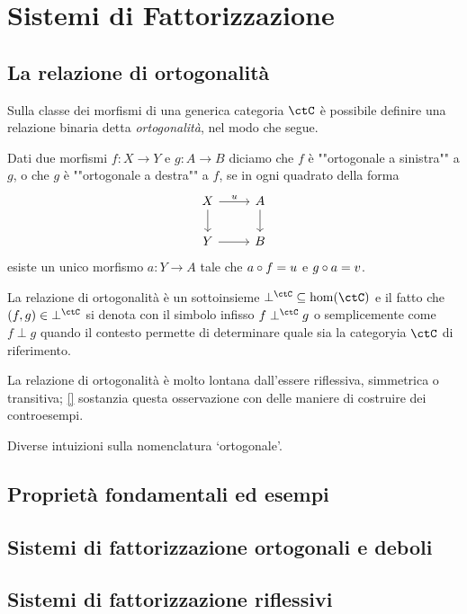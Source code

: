 \chapter{Sistemi di Fattorizzazione}
\section[Ortogonalità]{La relazione di ortogonalità}
Sulla classe dei morfismi di una generica categoria $\ctC$ è possibile definire una relazione binaria detta \emph{ortogonalità}, nel modo che segue.
\begin{definition}
    Dati due morfismi $f : X\to Y$ e $g : A\to B$ diciamo che $f$ è ""ortogonale a sinistra"" a $g$, o che $g$ è ""ortogonale a destra"" a $f$, se in ogni quadrato della forma 
    \[
   \begin{tikzcd}[baseline=(current bounding box.center)]
           X \ar[r, "u"]\ar[d]& A\ar[d] \\ 
           Y \ar[r]& B
   \end{tikzcd} 
    \]
esiste un unico morfismo $a : Y\to A$ tale che $a\circ f=u$ e $g\circ a=v$.
\end{definition}
La relazione di ortogonalità è un sottoinsieme $\mathbin{\perp^\ctC} \subseteq \hom(\ctC)$ e il fatto che $(f,g)\in \mathbin{\perp^\ctC}$ si denota con il simbolo infisso $f\perp^\ctC g$ o semplicemente come $f\perp g$ quando il contesto permette di determinare quale sia la categoryia \(\ctC\) di riferimento. 

La relazione di ortogonalità è molto lontana dall'essere riflessiva, simmetrica o transitiva; \autoref{} sostanzia questa osservazione con delle maniere di costruire dei controesempi.
\begin{remark}
Diverse intuizioni sulla nomenclatura `ortogonale'.
\end{remark}

\section[Proprietà ed esempi]{Proprietà fondamentali ed esempi}
\section[Fattorizzazione]{Sistemi di fattorizzazione ortogonali e deboli}
\section[Riflessività]{Sistemi di fattorizzazione riflessivi}
